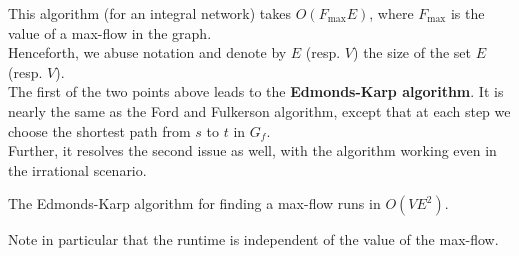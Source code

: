 			This algorithm (for an integral network) takes $O(F_\text{max}E)$, where $F_\text{max}$ is the value of a max-flow in the graph.\\

			Henceforth, we abuse notation and denote by $E$ (resp. $V$) the size of the set $E$ (resp. $V$).\\

			The first of the two points above leads to the \textbf{Edmonds-Karp algorithm}. It is nearly the same as the Ford and Fulkerson algorithm, except that at each step we choose the shortest path from $s$ to $t$ in $G_f$. \\
			Further, it resolves the second issue as well, with the algorithm working even in the irrational scenario.

			\begin{ftheo}
				The Edmonds-Karp algorithm for finding a max-flow runs in $O(VE^2)$.
			\end{ftheo}
			Note in particular that the runtime is independent of the value of the max-flow.

